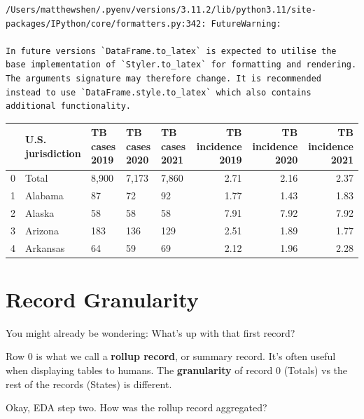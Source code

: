 \documentclass[
  letterpaper,
  DIV=11,
  numbers=noendperiod]{scrreprt}
\begin{document}
\begin{verbatim}
/Users/matthewshen/.pyenv/versions/3.11.2/lib/python3.11/site-packages/IPython/core/formatters.py:342: FutureWarning:

In future versions `DataFrame.to_latex` is expected to utilise the base implementation of `Styler.to_latex` for formatting and rendering. The arguments signature may therefore change. It is recommended instead to use `DataFrame.style.to_latex` which also contains additional functionality.
\end{verbatim}

\begin{tabular}{lllllrrr}
\toprule
{} & U.S. jurisdiction & TB cases 2019 & TB cases 2020 & TB cases 2021 &  TB incidence 2019 &  TB incidence 2020 &  TB incidence 2021 \\
\midrule
0 &             Total &         8,900 &         7,173 &         7,860 &               2.71 &               2.16 &               2.37 \\
1 &           Alabama &            87 &            72 &            92 &               1.77 &               1.43 &               1.83 \\
2 &            Alaska &            58 &            58 &            58 &               7.91 &               7.92 &               7.92 \\
3 &           Arizona &           183 &           136 &           129 &               2.51 &               1.89 &               1.77 \\
4 &          Arkansas &            64 &            59 &            69 &               2.12 &               1.96 &               2.28 \\
\bottomrule
\end{tabular}

\hypertarget{record-granularity}{%
\section{Record Granularity}\label{record-granularity}}

You might already be wondering: What's up with that first record?

Row 0 is what we call a \textbf{rollup record}, or summary record. It's
often useful when displaying tables to humans. The \textbf{granularity}
of record 0 (Totals) vs the rest of the records (States) is different.

Okay, EDA step two. How was the rollup record aggregated?
\end{document}
